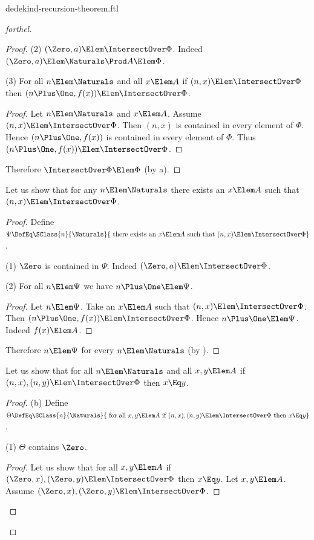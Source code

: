\documentclass{stex}
\begin{document}
\begin{smodule}{dedekind-recursion-theorem.ftl}
\begin{proof}[forthel]
\begin{proof}
    (2) $(\Zero, a) \Elem \IntersectOver \Phi$.
    Indeed $(\Zero, a) \Elem \Naturals \Prod A \Elem \Phi$.

    (3) For all $n \Elem \Naturals$ and all $x \Elem A$ if $(n, x) \Elem
    \IntersectOver \Phi$ then $(n \Plus \One, f(x)) \Elem \IntersectOver \Phi$.
    \begin{proof}
      Let $n \Elem \Naturals$ and $x \Elem A$.
      Assume $(n, x) \Elem \IntersectOver \Phi$.
      Then $(n, x)$ is contained in every element of $\Phi$.
      Hence $(n \Plus \One, f(x))$ is contained in every element of $\Phi$.
      Thus $(n \Plus \One, f(x)) \Elem \IntersectOver \Phi$.
    \end{proof}

    Therefore $\IntersectOver \Phi \Elem \Phi$ (by a).
  \end{proof}

  Let us show that for any $n \Elem \Naturals$ there exists an $x \Elem A$ such
  that $(n, x) \Elem \IntersectOver \Phi$.
  \begin{proof}
    Define $\Psi \DefEq \SClass{n}{\Naturals}{\text{ there exists an }x \Elem A\text{ such
    that }(n, x) \Elem \IntersectOver \Phi}$.

    (1) $\Zero$ is contained in $\Psi$.
    Indeed $(\Zero, a) \Elem \IntersectOver \Phi$.

    (2) For all $n \Elem \Psi$ we have $n \Plus \One \Elem \Psi$.
    \begin{proof}
      Let $n \Elem \Psi$.
      Take an $x \Elem A$ such that $(n, x) \Elem \IntersectOver \Phi$.
      Then $(n \Plus \One, f(x)) \Elem \IntersectOver \Phi$.
      Hence $n \Plus \One \Elem \Psi$.
      Indeed $f(x) \Elem A$.
    \end{proof}

    Therefore $n \Elem \Psi$ for every $n \Elem \Naturals$ (by ).
  \end{proof}

  Let us show that for all $n \Elem \Naturals$ and all $x, y \Elem A$ if
  $(n, x), (n, y) \Elem \IntersectOver \Phi$ then $x \Eq y$.
  \begin{proof}
    (b) Define $\Theta \DefEq \SClass{n}{\Naturals}{\text{ for all }x, y \Elem A\text{ if }
    (n, x), (n, y) \Elem \IntersectOver \Phi\text{ then }x \Eq y}$.

    (1) $\Theta$ contains $\Zero$.
    \begin{proof}
      Let us show that for all $x, y \Elem A$ if $(\Zero, x), (\Zero, y) \Elem
      \IntersectOver \Phi$ then $x \Eq y$.
        Let $x, y \Elem A$.
        Assume $(\Zero, x), (\Zero, y) \Elem \IntersectOver \Phi$.


\end{proof}
\end{proof}
\end{proof}
\end{smodule}
\end{document}
